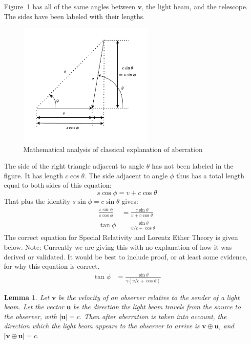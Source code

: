 \documentclass[a4paper]{article}
\theoremstyle{plain}
\newtheorem{lemma}[theorem]{Lemma}
\theoremstyle{definition}
\newcommand{\vect}[1]{\mathbf{#1}}
\begin{document}
Figure~\ref{fig:classical-aberration-analysis} has all of the same
angles between $\vect{v}$, the light beam, and the telescope.  The
sides have been labeled with their lengths.
\begin{figure}[ht]
	\centering
	\includegraphics[width=0.6\textwidth]{classical-aberration-analysis.pdf}
	\caption{Mathematical analysis of classical explanation of aberration}
	\label{fig:classical-aberration-analysis}
\end{figure}
The side of the right triangle adjacent to angle $\theta$ has not been
labeled in the figure.  It has length $c \cos \theta$.
The side adjacent to angle $\phi$ thus has a total length equal to
both sides of this equation:
\begin{equation}
s \cos \phi = v + c \cos \theta \nonumber
\end{equation}
That plus the identity $s \sin \phi = c \sin \theta$ gives:
\begin{align}
\frac{s \sin \phi}{s \cos \phi} & = \frac{c \sin \theta}{v + c \cos \theta} \nonumber \\
\tan \phi & = \frac{\sin \theta}{v/c + \cos \theta} \label{eqn:classical-aberration-angle}
\end{align}
The correct equation for Special Relativity and Lorentz Ether Theory
is given below.  Note: Currently we are giving this with no
explanation of how it was derived or validated.  It would be best to
include proof, or at least some evidence, for why this equation is
correct.
\begin{align}
\tan \phi & = \frac{\sin \theta}{\gamma(v/c + \cos \theta)} \label{eqn:aberration-angle}
\end{align}

\begin{lemma}
\label{lem:aberrationByRelVelAdd}
Let $\vect{v}$ be the velocity of an observer relative to
the sender of a light beam.
Let the vector $\vect{u}$ be the direction the light beam
travels from the source to the observer, with $|\vect{u}|=c$.
Then after aberration is taken into account, the direction which the
light beam appears to the observer to arrive is
$\vect{v} \oplus \vect{u}$,
and $|\vect{v} \oplus \vect{u}| = c$.
\end{lemma}
\end{document}
